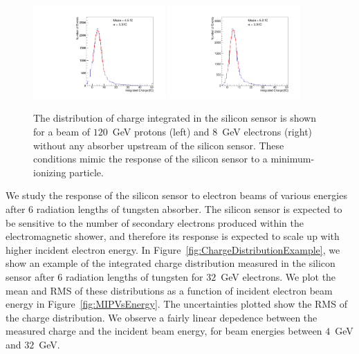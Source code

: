 \documentclass[12pt]{article}
\begin{document}
{\begin{figure}[htbp] 
\centering
\includegraphics[width=0.45\textwidth]{plots/Proton_charge.pdf} 
\includegraphics[width=0.45\textwidth]{plots/Electron_0X0_charge.pdf} 
\caption{The distribution of charge integrated in the silicon sensor is shown
for a beam of $120$~GeV protons (left) and $8$~GeV electrons (right) without
any absorber upstream of the silicon sensor. These conditions mimic the response
of the silicon sensor to a minimum-ionizing particle. 
} 
\label{fig:MIP} 
\end{figure} 

We study the response of the silicon sensor to electron beams of various energies after
6 radiation lengths of tungsten absorber. The silicon sensor is expected to be
sensitive to the number of secondary electrons produced within the electromagnetic
shower, and therefore its response is expected to scale up with higher incident
electron energy. In Figure~\ref{fig:ChargeDistributionExample}, we show
an example of the integrated charge distribution measured in the silicon sensor
after 6 radiation lengths of tungsten for $32$~GeV electrons. We plot the mean 
and RMS of these distributions as a function of incident electron beam energy
in Figure~\ref{fig:MIPVsEnergy}. The uncertainties plotted show the RMS
of the charge distribution. We observe a fairly linear depedence between
the measured charge and the incident beam energy, for beam energies
between $4$~GeV and $32$~GeV. 

}
\end{document}
